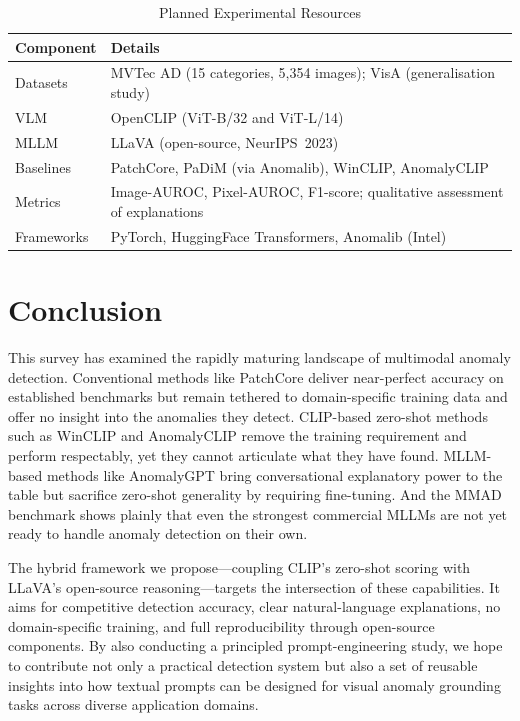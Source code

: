 \documentclass[conference]{IEEEtran}
\begin{document}
\begin{table}[h]
\centering
\caption{Planned Experimental Resources}
\label{tab:setup}
\renewcommand{\arraystretch}{1.35}
\begin{tabular}{|p{1.8cm}|p{5.5cm}|}
\hline
\textbf{Component} & \textbf{Details} \\
\hline\hline
Datasets & MVTec AD (15 categories, 5,354 images); VisA (generalisation study) \\
\hline
VLM & OpenCLIP (ViT-B/32 and ViT-L/14) \\
\hline
MLLM & LLaVA (open-source, NeurIPS~2023) \\
\hline
Baselines & PatchCore, PaDiM (via Anomalib), WinCLIP, AnomalyCLIP \\
\hline
Metrics & Image-AUROC, Pixel-AUROC, F1-score; qualitative assessment of explanations \\
\hline
Frameworks & PyTorch, HuggingFace Transformers, Anomalib (Intel) \\
\hline
\end{tabular}
\end{table}


\section{Conclusion}

This survey has examined the rapidly maturing landscape of multimodal anomaly detection. Conventional methods like PatchCore deliver near-perfect accuracy on established benchmarks but remain tethered to domain-specific training data and offer no insight into the anomalies they detect. CLIP-based zero-shot methods such as WinCLIP and AnomalyCLIP remove the training requirement and perform respectably, yet they cannot articulate what they have found. MLLM-based methods like AnomalyGPT bring conversational explanatory power to the table but sacrifice zero-shot generality by requiring fine-tuning. And the MMAD benchmark shows plainly that even the strongest commercial MLLMs are not yet ready to handle anomaly detection on their own.

The hybrid framework we propose---coupling CLIP's zero-shot scoring with LLaVA's open-source reasoning---targets the intersection of these capabilities. It aims for competitive detection accuracy, clear natural-language explanations, no domain-specific training, and full reproducibility through open-source components. By also conducting a principled prompt-engineering study, we hope to contribute not only a practical detection system but also a set of reusable insights into how textual prompts can be designed for visual anomaly grounding tasks across diverse application domains.
\end{document}
